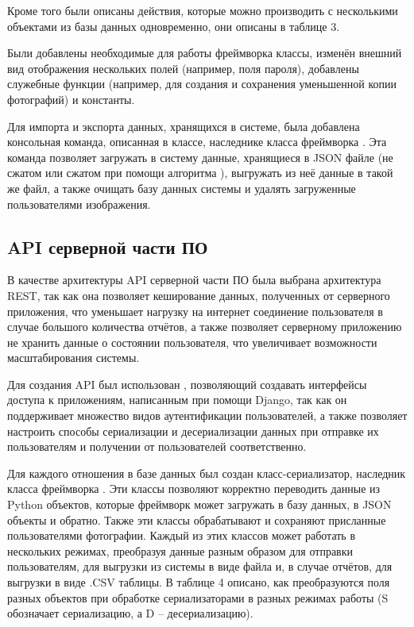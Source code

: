 \tab
Кроме того были описаны действия, которые можно производить с несколькими объектами из базы данных одновременно, они описаны в таблице 3.
\tablethree

\tab
Были добавлены необходимые для работы фреймворка  классы, изменён внешний вид отображения нескольких полей (например, поля пароля), добавлены служебные функции (например, для создания и сохранения уменьшенной копии фотографий) и константы.

\tab
Для импорта и экспорта данных, хранящихся в системе, была добавлена консольная команда, описанная в классе, наследнике класса  фреймворка .
Эта команда позволяет загружать в систему данные, хранящиеся в JSON файле (не сжатом или сжатом при помощи алгоритма ), выгружать из неё данные в такой же файл, а также очищать базу данных системы и удалять загруженные пользователями изображения.

\subsection{API серверной части ПО}

\tab
В качестве архитектуры API серверной части ПО была выбрана архитектура REST\cite{???}, так как она позволяет кеширование данных, полученных от серверного приложения, что уменьшает нагрузку на интернет соединение пользователя в случае большого количества отчётов, а также позволяет серверному приложению не хранить данные о состоянии пользователя, что увеличивает возможности масштабирования системы.

\tab
Для создания API был использован , позволяющий создавать интерфейсы доступа к приложениям, написанным при помощи Django, так как он поддерживает множество видов аутентификации пользователей, а также позволяет настроить способы сериализации и десериализации данных при отправке их пользователям и получении от пользователей соответственно.

\tab
Для каждого отношения в базе данных был создан класс-сериализатор, наследник класса  фреймворка .
Эти классы позволяют корректно переводить данные из Python объектов, которые фреймворк  может загружать в базу данных, в JSON объекты и обратно.
Также эти классы обрабатывают и сохраняют присланные пользователями фотографии.
Каждый из этих классов может работать в нескольких режимах, преобразуя данные разным образом для отправки пользователям, для выгрузки из системы в виде файла и, в случае отчётов, для выгрузки в виде .CSV таблицы.
В таблице 4 описано, как преобразуются поля разных объектов при обработке сериализаторами в разных режимах работы (S обозначает сериализацию, а D -- десериализацию).
\tablefour


